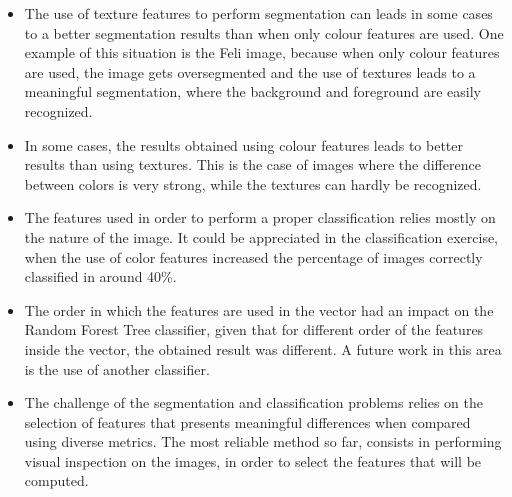\documentclass{IEEEtran}
\begin{document}
\begin{itemize}
 \item The use of texture features to perform segmentation can leads in some cases to a better segmentation results than when only colour features are used. One example of this situation is the Feli image, because when only colour features are used, the image gets oversegmented and the use of textures leads to a meaningful segmentation, where the background and foreground are easily recognized.
 \item In some cases, the results obtained using colour features leads to better results than using textures. This is the case of images where the difference between colors is very strong, while the textures can hardly be recognized.
 \item The features used in order to perform a proper classification relies mostly on the nature of the image. It could be appreciated in the classification exercise, when the use of color features increased the percentage of images correctly classified in around 40\%. 
 \item The order in which the features are used in the vector had an impact on the Random Forest Tree classifier, given that for different order of the features inside the vector, the obtained result was different. A future work in this area is the use of another classifier.
 \item The challenge of the segmentation and classification problems relies on the selection of features that presents meaningful differences when compared using diverse metrics. The most reliable method so far, consists in performing visual inspection on the images, in order to select the features that will be computed.
\end{itemize}




\newpage
\onecolumn
\appendix

\end{document}
